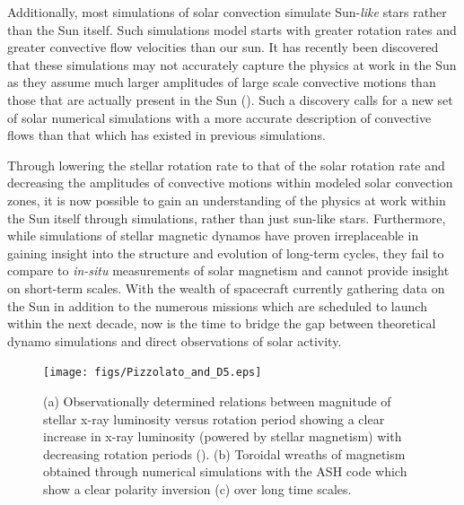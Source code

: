 \documentclass[aasms,12pt]{article}
\begin{document}
Additionally, most simulations
of solar convection simulate Sun-\emph{like} stars rather than the Sun
itself.  Such simulations model starts with greater rotation rates and greater
convective flow velocities than our sun.  It has recently been discovered
that these simulations may not accurately capture the physics at work
in the Sun as they assume much larger amplitudes of large scale convective
motions than those that are actually present in the Sun
(\citealt{lord2014}).  Such a discovery calls for a new set of solar 
numerical simulations with a more accurate description of convective flows
than that which has existed in previous simulations.

Through lowering the stellar rotation rate to that of the solar rotation rate
and decreasing the amplitudes of convective motions within modeled solar
convection zones, it is now possible to gain an understanding of the physics at
work within the Sun itself through simulations, rather than just sun-like
stars.
Furthermore, while simulations of stellar magnetic dynamos have proven
irreplaceable in gaining insight into the structure and evolution of 
long-term cycles, they fail to compare to \emph{in-situ} measurements
of solar magnetism and cannot provide insight on short-term scales.
With the wealth of spacecraft currently gathering data on
the Sun in addition to the numerous missions which are scheduled to launch
within the next decade, now is the time to bridge the gap between theoretical
dynamo simulations and direct observations of solar activity.


\begin{figure}[t!]
\centering
\texttt{[image: figs/Pizzolato\_and\_D5.eps]}
\caption{(a) Observationally determined relations between magnitude of stellar
	x-ray luminosity versus rotation period showing a clear increase in
	x-ray luminosity (powered by stellar magnetism) with decreasing rotation
	periods (\citealt{Pizzolato2003}).  (b) Toroidal wreaths of magnetism
	obtained through numerical simulations with the ASH code which show a
	clear polarity inversion (c) over long time scales.
        \label{wreaths}}
\end{figure}
\end{document}
